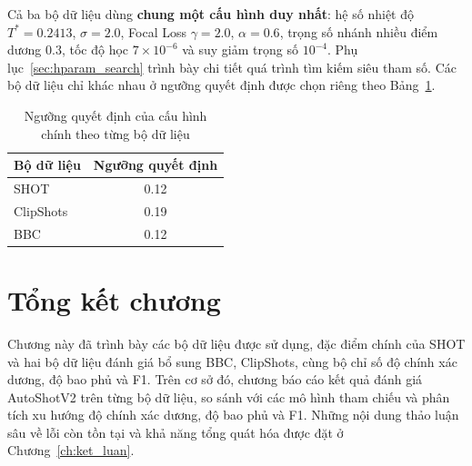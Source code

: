 Cả ba bộ dữ liệu dùng \textbf{chung một cấu hình duy nhất}: hệ số nhiệt độ $T^* = 0.2413$, $\sigma = 2.0$, Focal Loss $\gamma = 2.0$, $\alpha = 0.6$, trọng số nhánh nhiều điểm dương $0.3$, tốc độ học $7\times10^{-6}$ và suy giảm trọng số $10^{-4}$. Phụ lục~\ref{sec:hparam_search} trình bày chi tiết quá trình tìm kiếm siêu tham số. Các bộ dữ liệu chỉ khác nhau ở ngưỡng quyết định được chọn riêng theo Bảng~\ref{tab:autoshotv2_dataset_thresholds}.

\begin{table}[H]
\centering
\small
\caption{Ngưỡng quyết định của cấu hình chính theo từng bộ dữ liệu}
\label{tab:autoshotv2_dataset_thresholds}
\begin{tabular}{lc}
\toprule
\textbf{Bộ dữ liệu} & \textbf{Ngưỡng quyết định} \\
\midrule
SHOT & 0.12 \\
ClipShots & 0.19 \\
BBC & 0.12 \\
\bottomrule
\end{tabular}
\end{table}



\section{Tổng kết chương}
Chương này đã trình bày các bộ dữ liệu được sử dụng, đặc điểm chính của SHOT và hai bộ dữ liệu đánh giá bổ sung BBC, ClipShots, cùng bộ chỉ số độ chính xác dương, độ bao phủ và F1. Trên cơ sở đó, chương báo cáo kết quả đánh giá AutoShotV2 trên từng bộ dữ liệu, so sánh với các mô hình tham chiếu và phân tích xu hướng độ chính xác dương, độ bao phủ và F1. Những nội dung thảo luận sâu về lỗi còn tồn tại và khả năng tổng quát hóa được đặt ở Chương~\ref{ch:ket_luan}.
